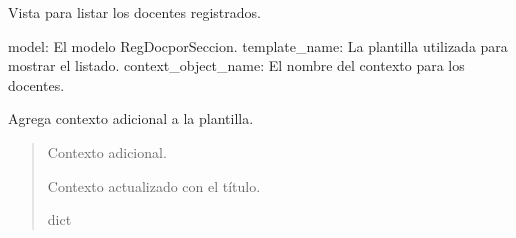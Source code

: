 \documentclass[letterpaper,10pt,spanish]{sphinxmanual}
\begin{document}
\begin{fulllineitems}

\pysigstartsignatures
{}
\pysigstopsignatures
\sphinxAtStartPar
Vista para listar los docentes registrados.
\begin{description}
\sphinxAtStartPar
model: El modelo RegDocporSeccion.
template\_name: La plantilla utilizada para mostrar el listado.
context\_object\_name: El nombre del contexto para los docentes.

\end{description}


\begin{fulllineitems}

\pysigstartsignatures
{}
\pysigstopsignatures
\end{fulllineitems}



\begin{fulllineitems}

\pysigstartsignatures
{}
\pysigstopsignatures
\end{fulllineitems}



\begin{fulllineitems}

\pysigstartsignatures
{}
\pysigstopsignatures
\sphinxAtStartPar
Agrega contexto adicional a la plantilla.
\begin{quote}\begin{description}
\sphinxAtStartPar
{} \textendash{} Contexto adicional.

\sphinxAtStartPar
Contexto actualizado con el título.

\sphinxAtStartPar
dict


\end{description}
\end{quote}
\end{fulllineitems}
\end{fulllineitems}
\end{document}
